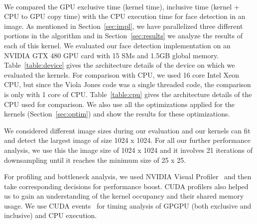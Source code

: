 \paragraph{}
We compared the GPU exclusive time (kernel time),
inclusive time (kernel + CPU to GPU copy time) with the CPU execution time 
for face detection in an image.
As mentioned in Section~\ref{sec:impl}, we have parallelized three different
portions in the algorithm and in Section~\ref{sec:results} we analyze the results of each of this kernel.
We evaluated our face detection implementation on an NVIDIA GTX 480 GPU card with 15 SMs and 1.5GB global memory.
Table~\ref{table:device} gives the architecture details of the device on which we evaluated the kernels. For comparison with CPU, 
we used 16 core Intel Xeon CPU, but since the Viola Jones code was a single threaded code, the comparison is only with
1 core of CPU. Table~\ref{table:cpu} gives the architecture details of the CPU used for comparison. 
We also use all the optimizations applied for the kernels (Section~\ref{sec:optim}) and show the
results for these optimizations. 

We considered different image sizes during our evaluation and our kernels can fit and detect
the largest  image of size 1024 x 1024. For all our further performance analysis, we use this the image size of 1024 x 1024 
and it involves 21 iterations of downsampling until it reaches the minimum size of 25 x 25.

For profiling and bottleneck analysis, we used
NVIDIA Visual Profiler~\cite{rosen2013visual} and then take corresponding decisions for performance boost. CUDA profilers also helped us to gain an understanding 
of the kernel occupancy and their shared memory usage.
We use CUDA events~\cite{wilt2013cuda} for timing analysis of GPGPU (both exclusive and inclusive) and
CPU execution.  


